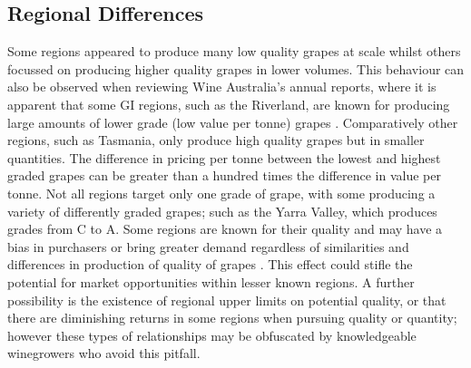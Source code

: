 \documentclass[review,12pt,authoryear]{elsarticle}
\begin{document}
\begin{linenumbers}
\subsection{Regional Differences}
Some regions appeared to produce many low quality grapes at scale whilst others focussed on producing higher quality grapes in lower volumes. This behaviour can also be observed when reviewing Wine Australia's annual reports, where it is apparent that some GI regions, such as the Riverland, are known for producing large amounts of lower grade (low value per tonne) grapes \cite{wineaustraliaNationalVintageReport2022,winemakersfederationofaustraliaNationalVintageReport2017}. Comparatively other regions, such as Tasmania, only produce high quality grapes but in smaller quantities. The difference in pricing per tonne between the lowest and highest graded grapes can be greater than a hundred times the difference in value per tonne.
Not all regions target only one grade of grape, with some producing a variety of differently graded grapes; such as the Yarra Valley, which produces grades from C to A.
\newline
Some regions are known for their quality and may have a bias in purchasers or bring greater demand regardless of similarities and differences in production of quality of grapes \citep{hallidayAustralianWineEncyclopedia2009}. 
This effect could stifle the potential for market opportunities within lesser known regions. A further possibility is the existence of regional upper limits on potential quality, or that there are diminishing returns in some regions when pursuing quality or quantity; however these types of relationships may be obfuscated by knowledgeable winegrowers who avoid this pitfall.
%
\newline

\end{linenumbers}
\end{document}
